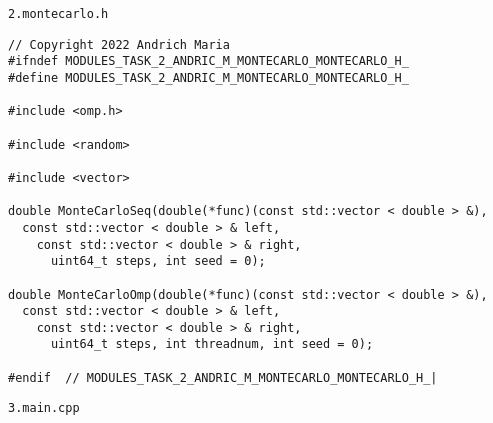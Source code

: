 \documentclass{report}
\begin{document}
\par \verb|2.montecarlo.h|
\begin{lstlisting}
// Copyright 2022 Andrich Maria
#ifndef MODULES_TASK_2_ANDRIC_M_MONTECARLO_MONTECARLO_H_
#define MODULES_TASK_2_ANDRIC_M_MONTECARLO_MONTECARLO_H_

#include <omp.h>

#include <random>

#include <vector>

double MonteCarloSeq(double(*func)(const std::vector < double > &),
  const std::vector < double > & left,
    const std::vector < double > & right,
      uint64_t steps, int seed = 0);

double MonteCarloOmp(double(*func)(const std::vector < double > &),
  const std::vector < double > & left,
    const std::vector < double > & right,
      uint64_t steps, int threadnum, int seed = 0);

#endif  // MODULES_TASK_2_ANDRIC_M_MONTECARLO_MONTECARLO_H_|
\end{lstlisting}
\par \verb|3.main.cpp|
\end{document}
